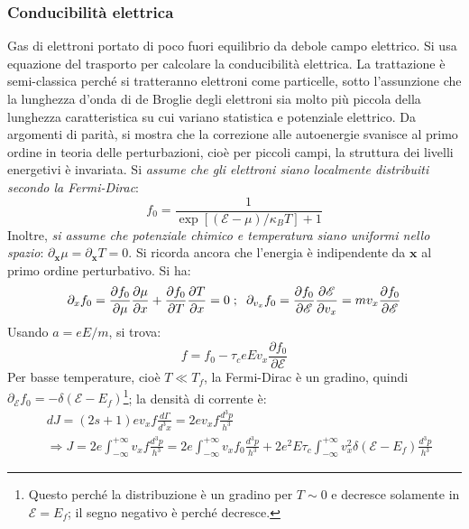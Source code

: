 \documentclass[10pt, a4paper]{scrartcl}
\numberwithin{equation}{subsection}
\theoremstyle{style1}
\begin{document}
\subsubsection{Conducibilit\`a elettrica}
Gas di elettroni portato di poco fuori equilibrio da debole campo elettrico.
Si usa equazione del trasporto per calcolare la conducibilit\`a elettrica.
La trattazione \`e semi-classica perch\'e si tratteranno elettroni come particelle, sotto l'assunzione che la lunghezza d'onda
di de Broglie degli elettroni sia molto pi\`u piccola della lunghezza caratteristica su cui variano statistica e potenziale elettrico.
Da argomenti di parit\`a, si mostra che la correzione alle autoenergie svanisce al primo ordine in teoria delle perturbazioni, cio\`e per piccoli campi,
la struttura dei livelli energetivi \`e invariata.
Si \textit{assume che gli elettroni siano localmente distribuiti secondo la Fermi-Dirac}:
\begin{equation}
	f_0 = \frac{1}{\exp\left[ (\mathscr{E}-\mu ) /\kappa _B T  \right] +1}
\end{equation}
Inoltre, \textit{si assume che potenziale chimico e temperatura siano uniformi nello spazio}: $\partial _\mathbf{x} \mu = \partial _\mathbf{x} T = 0$.
Si ricorda ancora che l'energia \`e indipendente da $\mathbf{x} $ al primo ordine perturbativo.
Si ha:
\[
	\partial _x f_0 = \frac{\partial f_0}{\partial \mu } \frac{\partial \mu }{\partial x} + \frac{\partial f_0}{\partial T} \frac{\partial T}{\partial x} = 0 \hspace{.1cm} ; \hspace{.2cm} \partial _{v_x} f_0 = \frac{\partial f_0}{\partial \mathscr{E}} \frac{\partial \mathscr{E}}{\partial v_x} = mv_x \frac{\partial f_0}{\partial \mathscr{E}} 
\] 
Usando $a = eE / m$, si trova:
\begin{equation}
	f = f_0- \tau _c e E v_x \frac{\partial f_0}{\partial \mathscr{E}} 
\end{equation}
Per basse temperature, cio\`e $T\ll T_f$, la Fermi-Dirac \`e un gradino, quindi $\partial _\mathscr{E} f_0 = -\delta  (\mathscr{E}-E_f)$\footnote{Questo perch\'e la distribuzione \`e un gradino per $T\sim 0 $ e decresce solamente in $\mathscr{E} = E_f$; il segno negativo \`e perch\'e decresce.};
la densit\`a di corrente \`e:
\begin{equation}
	\begin{split}
		&dJ = (2s+1) ev_x f \frac{d \Gamma}{d ^3 x}  = 2ev_x f \frac{d^3 p}{h^3}\\
		&\Rightarrow J = 2e \int_{-\infty} ^{+\infty}  v_x f \frac{d^3 p}{h^3} = 2e \int_{-\infty} ^{+\infty}  v_x f_0 \frac{d^3 p}{h^3} + 2e^2 E \tau _c \int_{-\infty} ^{+\infty}  v_x^2 \delta (\mathscr{E}-E_f) \frac{d^3p}{ h^3} 
	\end{split}
\end{equation}
\end{document}
